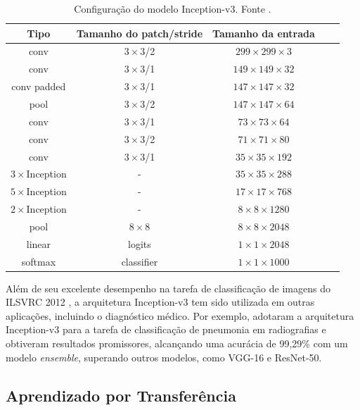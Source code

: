 \begin{table}[!htbp]
    \centering
    \caption{Configuração do modelo Inception-v3. Fonte .}
    \label{inception-v3-arch}
    \footnotesize
    \begin{tabular}{|c|c|c|c|c|}
        \hline
        \textbf{Tipo} & \textbf{Tamanho do patch/stride} & \textbf{Tamanho da entrada} \\
        \hline
        conv & $3\times3$/2 & $299\times299\times3$ \\
        \hline
        conv & $3\times3$/1 & $149\times149\times32$ \\
        \hline
        conv padded & $3\times3$/1 & $147\times147\times32$ \\
        \hline
        pool & $3\times3$/2 & $147\times147\times64$ \\
        \hline
        conv & $3\times3$/1 & $73\times73\times64$ \\
        \hline
        conv & $3\times3$/2 & $71\times71\times80$ \\
        \hline
        conv & $3\times3$/1 & $35\times35\times192$ \\
        \hline
        $3\times$Inception & - & $35\times35\times288$ \\
        \hline
        $5\times$Inception & - & $17\times17\times768$ \\
        \hline
        $2\times$Inception & - & $8\times8\times1280$ \\
        \hline
        pool & $8\times8$ & $8\times8\times2048$ \\
        \hline
        linear & logits & $1\times1\times2048$ \\
        \hline
        softmax & classifier & $1\times1\times1000$ \\
        \hline
    \end{tabular}
\end{table}

Além de seu excelente desempenho na tarefa de classificação de imagens do ILSVRC 2012 \cite{Russakovsky2015}, a arquitetura Inception-v3 tem sido utilizada em outras aplicações, incluindo o diagnóstico médico. Por exemplo,  adotaram a arquitetura Inception-v3 para a tarefa de classificação de pneumonia em radiografias e obtiveram resultados promissores, alcançando uma acurácia de 99,29\% com um modelo \textit{ensemble}, superando outros modelos, como VGG-16 e ResNet-50.

\subsection{Aprendizado por Transferência}

